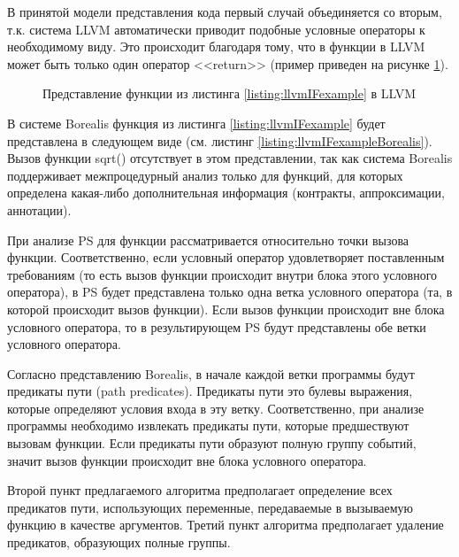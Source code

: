 В принятой модели представления кода первый случай объединяется со вторым, т.к. система LLVM автоматически приводит подобные условные операторы к необходимому виду. Это происходит благодаря тому, что в функции в LLVM может быть только один оператор <<return>> (пример приведен на рисунке \ref{image:llvmIFcfg}).

 	
\begin{figure}[h!]
\caption{Представление функции из листинга \ref{listing:llvmIFexample} в LLVM}
\label{image:llvmIFcfg}
\end{figure}

В системе Borealis функция из листинга \ref{listing:llvmIFexample} будет представлена в следующем виде (см. листинг \ref{listing:llvmIFexampleBorealis}). Вызов функции sqrt() отсутствует в этом представлении, так как система Borealis поддерживает межпроцедурный анализ только для функций, для которых определена какая-либо дополнительная информация (контракты, аппроксимации, аннотации).


При анализе PS для функции рассматривается относительно точки вызова функции. Соответственно, если условный оператор удовлетворяет поставленным требованиям (то есть вызов функции происходит внутри блока этого условного оператора), в PS будет представлена только одна ветка условного оператора (та, в которой происходит вызов функции). Если вызов функции происходит вне блока условного оператора, то в результирующем PS будут представлены обе ветки условного оператора.

Согласно представлению Borealis, в начале каждой ветки программы будут предикаты пути (path predicates). Предикаты пути это булевы выражения, которые определяют условия входа в эту ветку. Соответственно, при анализе программы необходимо извлекать предикаты пути, которые предшествуют вызовам функции. Если предикаты пути образуют полную группу событий, значит вызов функции происходит вне блока условного оператора.

Второй пункт предлагаемого алгоритма предполагает определение всех предикатов пути, использующих переменные, передаваемые в вызываемую функцию в качестве аргументов. Третий пункт алгоритма предполагает удаление предикатов, образующих полные группы.

